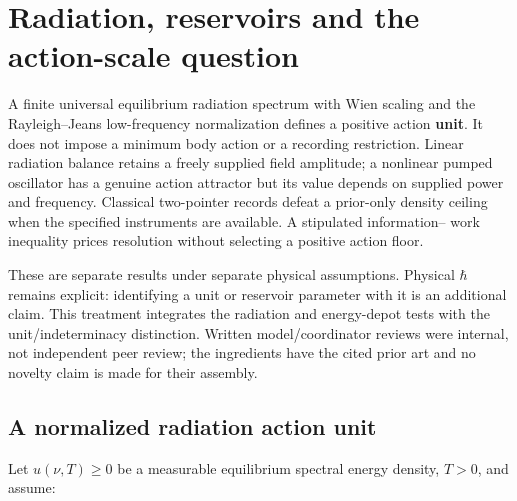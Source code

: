 \documentclass[11pt,a4paper]{article}
\begin{document}
\hypertarget{radiation-reservoirs-and-the-action-scale-question}{%
\section{Radiation, reservoirs and the action-scale
question}\label{radiation-reservoirs-and-the-action-scale-question}}

A finite universal equilibrium radiation spectrum with Wien scaling and
the Rayleigh--Jeans low-frequency normalization defines a positive
action \textbf{unit}. It does not impose a minimum body action or a
recording restriction. Linear radiation balance retains a freely
supplied field amplitude; a nonlinear pumped oscillator has a genuine
action attractor but its value depends on supplied power and frequency.
Classical two-pointer records defeat a prior-only density ceiling when
the specified instruments are available. A stipulated information-- work
inequality prices resolution without selecting a positive action floor.

These are separate results under separate physical assumptions. Physical
\(\hbar\) remains explicit: identifying a unit or reservoir parameter
with it is an additional claim. This treatment integrates the radiation
and energy-depot tests with the unit/indeterminacy distinction. Written
model/coordinator reviews were internal, not independent peer review;
the ingredients have the cited prior art and no novelty claim is made
for their assembly.

\hypertarget{a-normalized-radiation-action-unit}{%
\subsection{A normalized radiation action
unit}\label{a-normalized-radiation-action-unit}}

Let \(u(\nu,T)\ge0\) be a measurable equilibrium spectral energy
density, \(T>0\), and assume:
\end{document}
